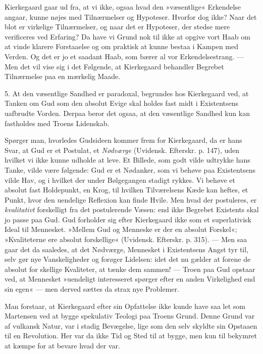 \documentclass[12pt,a4paper,openany]{book}
\newcommand{\opage}[1]{\marginnote{\footnotesize\textit{[#1]}}}
\begin{document}
Kierkegaard gaar ud fra, at vi ikke, ogsaa hvad
den »væsentlige« Erkendelse angaar, kunne nøjes med
\opage{66}Tilnærmelser og Hypoteser. Hvorfor dog ikke? Naar
det blot er virkelige Tilnærmelser, og naar det er Hypoteser,
der stedse mere verificeres ved Erfaring? Da have
vi Grund nok til ikke at opgive vort Haab om at vinde
klarere Forstaaelse og om praktisk at kunne bestaa i
Kampen med Verden. Og det er jo et saadant Haab,
som bærer al vor Erkendelsestrang. --- Men det vil vise
sig i det Følgende, at Kierkegaard behandler Begrebet
Tilnærmelse paa en mærkelig Maade.

5. At den væsentlige Sandhed er paradoxal, begrundes
hos Kierkegaard ved, at Tanken om Gud som
den absolut Evige skal holdes fast midt i Existentsens
uafbrudte Vorden. Derpaa beror det ogsaa, at den
væsentlige Sandhed kun kan fastholdes med Troens
Lidenskab.

Spørger man, hvorledes Gudsideen kommer frem for
Kierkegaard, da er hans Svar, at Gud er et Postulat, et
\textit{Nødværge} (Uvidensk. Efterskr. p. 147), uden hvilket vi
ikke kunne udholde at leve. Et Billede, som godt vilde
udtrykke hans Tanke, vilde være følgende: Gud er et
Nødanker, som vi behøve paa Existentsens vilde Hav, og
i hvilket der under Bølgegangen stadigt rykkes. Vi behøve
et absolut fast Holdepunkt, en Krog, til hvilken
Tilværelsens Kæde kan heftes, et Punkt, hvor den uendelige
Reflexion kan finde Hvile. Men hvad der postuleres,
er \textit{kvalitativt} forskelligt fra det postulerende Væsen: end
ikke Begrebet Existents skal jo passe paa Gud. Gud
forholder sig efter Kierkegaard ikke som et superlativisk
Ideal til Mennesket. »Mellem Gud og Menneske er der
en absolut Forskel«; »Kvaliteterne ere absolut forskellige«
(Uvidensk. Efterskr. p. 315). --- Men saa gaar det
da saaledes, at det Nødværge, Mennesket i Existentsens
Angst tyr til, selv gør nye Vanskeligheder og forøger
Lidelsen: idet det nu gælder at forene de absolut for%
\opage{67}skellige Kvaliteter, at tænke dem sammen! --- Troen paa
Gud opstaar ved, at Mennesket »uendeligt interesseret
spørger efter en anden Virkelighed end sin egen« --- men
derved sættes da strax nye Problemer.

Man forstaar, at Kierkegaard efter sin Opfattelse
ikke kunde have saa let som Martensen ved at bygge
spekulativ Teologi paa Troens Grund. Denne Grund var
af vulkansk Natur, var i stadig Bevægelse, lige som den
selv skyldte sin Opstaaen til en Revolution. Her var da
ikke Tid og Sted til at bygge, men kun til bekymret at
kæmpe for at bevare hvad der var.
\end{document}
